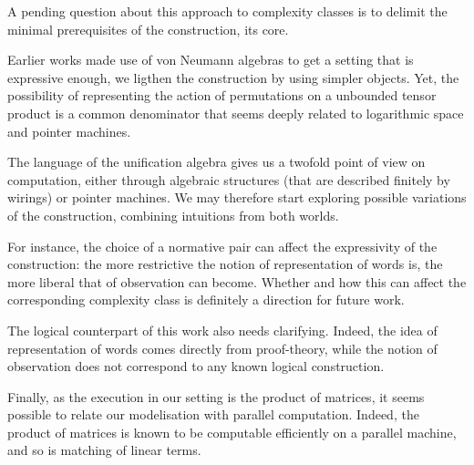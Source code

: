 A pending question about this approach to complexity classes is to delimit the minimal prerequisites of the construction, its core.

Earlier works \cite{girard_normativity_2012,aubert_characterizing_2012,seiller_logarithmic_2013} made use of von Neumann algebras to get a setting that is expressive enough, we ligthen the construction by using simpler objects.
Yet, the possibility of representing the action of permutations on a unbounded tensor product is a common denominator that seems deeply related to logarithmic space and pointer machines.

\smallskip
The language of the unification algebra gives us a twofold point of view on computation, either through algebraic structures (that are described finitely by wirings) or pointer machines.
We may therefore start exploring possible variations of the construction, combining intuitions from both worlds.

\smallskip
For instance, the choice of a normative pair can affect the expressivity of the construction:
the more restrictive the notion of representation of words is, the more liberal that of observation can become.
Whether and how this can affect the corresponding complexity class is definitely a direction for future work.

\smallskip
The logical counterpart of this work also needs clarifying.
Indeed, the idea of representation of words comes directly from proof-theory, while the notion of observation does not correspond to any known logical construction.

\smallskip
Finally, as the execution in our setting is the product of matrices, it seems possible to relate our modelisation with parallel computation. Indeed, the product of matrices is known to be computable efficiently on a parallel machine, and so is matching of linear terms.
